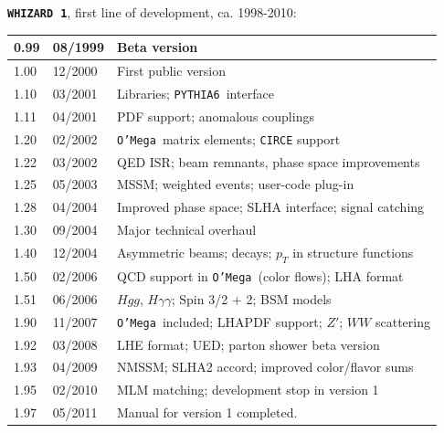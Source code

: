 \documentclass[12pt]{book}
\newcommand{\ttt}[1]{\texttt{#1}}
\newcommand{\whizard}{\ttt{WHIZARD}}
\newcommand{\oMega}{\ttt{O'Mega}}
\newcommand{\pythiasix}{\ttt{PYTHIA6}}
\begin{document}
\newpage

{
{\bf \whizard\ \texttt{1}}, first line of development, ca. 1998-2010:
\nopagebreak[4]
\begin{center}
\begin{tabular}{|l|l|l|}\hline
  0.99 & 08/1999 & Beta version \\\hline
  1.00 & 12/2000 & First public version \\\hline
  1.10 & 03/2001 & Libraries; \pythiasix\ interface \\
  1.11 & 04/2001 & PDF support; anomalous couplings \\ \hline
  1.20 & 02/2002 & \oMega\ matrix elements; \ttt{CIRCE} support\\
  1.22 & 03/2002 & QED ISR; beam remnants, phase space improvements \\
  1.25 & 05/2003 & MSSM; weighted events; user-code plug-in \\
  1.28 & 04/2004 & Improved phase space; SLHA interface; signal catching
  \\\hline
  1.30 & 09/2004 & Major technical overhaul \\\hline
  1.40 & 12/2004 & Asymmetric beams; decays; $p_T$ in structure
  functions \\\hline
  1.50 & 02/2006 & QCD support in \oMega\ (color flows); LHA format \\
  1.51 & 06/2006 & $Hgg$, $H\gamma\gamma$; Spin 3/2 + 2; BSM models
  \\\hline
  1.90 & 11/2007 & \oMega\ included; LHAPDF support; $Z'$; $WW$ scattering \\
  1.92 & 03/2008 & LHE format; UED; parton shower beta version \\
  1.93 & 04/2009 & NMSSM; SLHA2 accord; improved color/flavor sums \\
  1.95 & 02/2010 & MLM matching; development stop in version 1
  \\
  1.97 & 05/2011 & Manual for version 1 completed. \\\hline\hline
\end{tabular}
\end{center}
}

\vspace{2cm}
\end{document}
